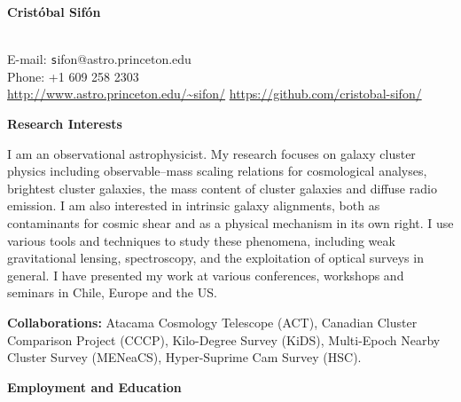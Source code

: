 \documentclass[11pt]{article}
\newcommand\technical[2]{
  \noindent
    {\large\bf #1:} #2\\
  }
\newcommand\sectitle[1]{
  \vspace{0.5cm}
  \noindent
  \textbf{\large #1}\\
  \vspace{-0.2cm}
}
\begin{document}
\begin{minipage}[b]{0.46\linewidth}
\flushleft
\hspace{-0.7cm}
{\bf\huge Crist\'obal Sif\'on}\\\vspace{0.2cm}
\\
\end{minipage}
\begin{minipage}[b]{0.49\linewidth}
\flushright
{\large E-mail: {\texttt sifon@astro.princeton.edu}\\
        Phone: +1 609 258 2303\\
        \url{http://www.astro.princeton.edu/~sifon/}
        \url{https://github.com/cristobal-sifon/}}
\end{minipage}
\vspace{0.4cm}
\hline


\sectitle{Research Interests}

I am an observational astrophysicist. My research focuses on galaxy 
cluster physics including observable--mass scaling relations for cosmological 
analyses, brightest cluster galaxies, the mass content of cluster galaxies and 
diffuse radio emission. I am also interested in intrinsic galaxy alignments, both 
as contaminants for cosmic shear and as a physical mechanism in its own right. I 
use various tools and techniques to study these phenomena, including weak 
gravitational lensing, spectroscopy, and the exploitation of optical surveys in 
general. I have presented my work at various conferences, workshops and seminars 
in Chile, Europe and the US.

\technical{Collaborations}
{Atacama Cosmology Telescope (ACT), Canadian Cluster Comparison Project (CCCP), 
Kilo-Degree Survey (KiDS), Multi-Epoch Nearby Cluster Survey (MENeaCS), 
Hyper-Suprime Cam Survey (HSC).}

\vspace{-0.5cm}
\sectitle{Employment and Education}
\end{document}
